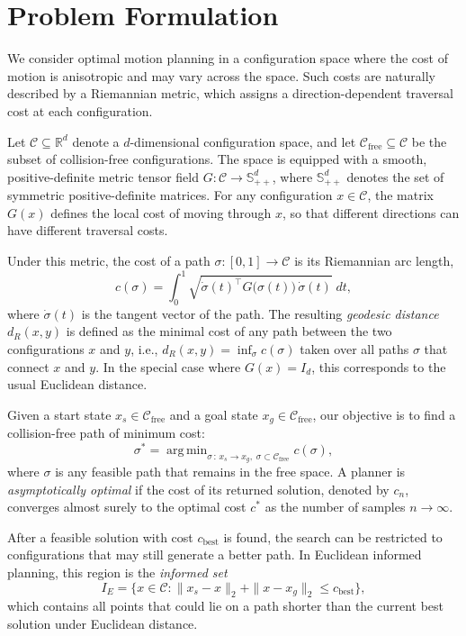 \documentclass[journal]{IEEEtran}
\newcommand{\Cfree}{\mathcal{C}_{\mathrm{free}}}
\newcommand{\Cspace}{\mathcal{C}}
\newcommand{\IE}{I_{\!E}}
\newcommand{\dR}{d_{\!R}}
\newcommand{\SPD}{\mathbb{S}_{++}^{d}}
\DeclareMathOperator*{\argmin}{arg\,min}
\begin{document}
\section{Problem Formulation}\label{sec:problem}

We consider optimal motion planning in a configuration space where the
cost of motion is anisotropic and may vary across the space. Such costs
are naturally described by a Riemannian metric, which assigns a
direction-dependent traversal cost at each configuration.

Let $\Cspace \subseteq \mathbb{R}^d$ denote a $d$-dimensional
configuration space, and let $\Cfree \subseteq \Cspace$ be the subset of
collision-free configurations. The space is equipped with a smooth,
positive-definite metric tensor field
$G : \Cspace \to \SPD$, where $\SPD$ denotes the set of symmetric
positive-definite matrices. For any configuration $x \in \Cspace$, the
matrix $G(x)$ defines the local cost of moving through $x$, so that
different directions can have different traversal costs.

Under this metric, the cost of a path $\sigma : [0,1] \to \Cspace$ is
its Riemannian arc length,
\begin{equation}\label{eq:cost}
  c(\sigma) = \int_0^1 \!\sqrt{\dot{\sigma}(t)^\top G\bigl(\sigma(t)\bigr)\, \dot{\sigma}(t)}\; dt,
\end{equation}
where $\dot{\sigma}(t)$ is the tangent vector of the path. The resulting
\emph{geodesic distance} $\dR(x,y)$ is defined as the minimal cost of any path between the two
configurations $x$ and $y$, i.e.,
$\dR(x,y) = \inf_\sigma c(\sigma)$ taken over all paths $\sigma$ that connect
$x$ and $y$. In the special case where $G(x) = I_d$, this corresponds to the usual Euclidean
distance.

Given a start state $x_s \in \Cfree$ and a goal state $x_g \in \Cfree$,
our objective is to find a collision-free path of minimum cost:
\begin{equation}\label{eq:opt}
  \sigma^* = \argmin_{\sigma \,:\, x_s \to x_g,\; \sigma \subset \Cfree} c(\sigma),
\end{equation}
where $\sigma$ is any feasible path that remains in the free space. A
planner is \emph{asymptotically optimal} if the cost of its returned
solution, denoted by $c_n$, converges almost surely to the optimal cost
$c^*$ as the number of samples $n \to \infty$.

After a feasible solution with cost $c_{\mathrm{best}}$ is found, the
search can be restricted to configurations that may still generate a
better path. In Euclidean informed planning, this region is the
\emph{informed set}
\begin{equation}\label{eq:IE}
  \IE = \bigl\{ x \in \Cspace : \|x_s - x\|_2 + \|x - x_g\|_2 \le c_{\mathrm{best}} \bigr\},
\end{equation}
which contains all points that could lie on a path shorter than the
current best solution under Euclidean distance.
\end{document}
